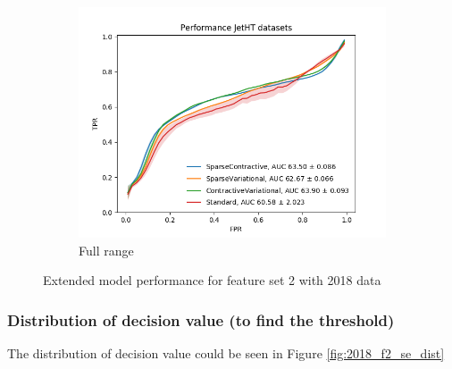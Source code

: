 \begin{figure}[h!]
\begin{subfigure}[b]{0.49\linewidth}
        \includegraphics[width=\linewidth]{images/reco/2018/feature_2/performance_JetHT_SparseContractiveSparseVariationalContractiveVariationalStandard.png}
        \caption{Full range}
    \end{subfigure}
    \caption{Extended model performance for feature set 2 with 2018 data}
\label{fig:2018_f2_extended_ae_performance}
\end{figure}

\subsubsection{Distribution of decision value (to find the threshold)}
The distribution of decision value could be seen in Figure \ref{fig:2018_f2_se_dist}

